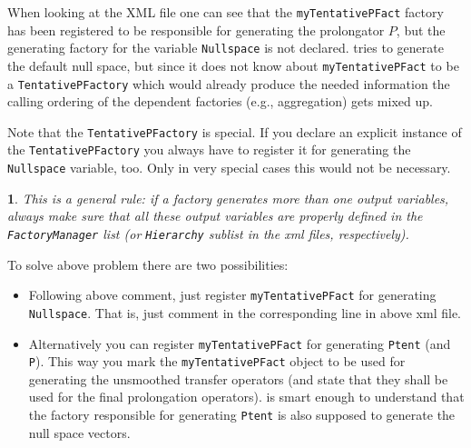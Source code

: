 \documentclass[10pt,fleqn]{book}
\newtheorem*{mycomment}{\ding{42}}
\begin{document}
When looking at the XML file one can see that the \verb|myTentativePFact| factory has been registered to be responsible for generating  the prolongator $P$, but the generating factory for the variable \verb|Nullspace| is not declared. \muelu tries to generate the default null space, but since it does not know about \verb|myTentativePFact| to be a \verb|TentativePFactory| which would already produce the needed information the calling ordering of the dependent factories (e.g., aggregation) gets mixed up.

Note that the \verb|TentativePFactory| is special. If you declare an explicit instance of the \verb|TentativePFactory| you always have to register it for generating the \verb|Nullspace| variable, too. Only in very special cases this would not be necessary.

\begin{mycomment}
This is a general rule: if a factory generates more than one output variables, always make sure that all these output variables are properly defined in the \verb|FactoryManager| list (or \verb|Hierarchy| sublist in the xml files, respectively).
\end{mycomment}

To solve above problem there are two possibilities:
\begin{itemize}
\item Following above comment, just register \verb|myTentativePFact| for generating \verb|Nullspace|. That is, just comment in the corresponding line in above xml file.
\item Alternatively you can register \verb|myTentativePFact| for generating \verb|Ptent| (and \verb|P|). This way you mark the \verb|myTentativePFact| object to be used for generating the unsmoothed transfer operators (and state that they shall be used for the final prolongation operators). \muelu is smart enough to understand that the factory responsible for generating \verb|Ptent| is also supposed to generate the null space vectors.
\end{itemize}
\end{document}
